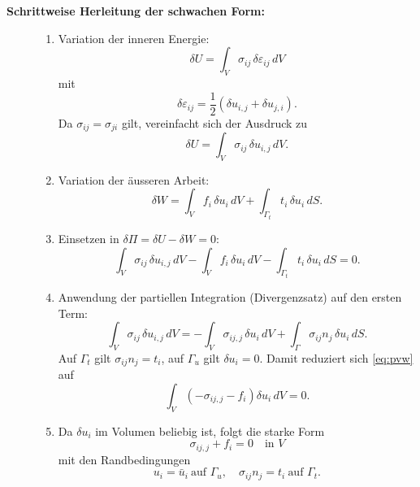 \begin{description}
	\item[\textbf{Schrittweise Herleitung der schwachen Form:}]
	\begin{enumerate}
		\item Variation der inneren Energie:
		\begin{equation*}
			\delta U = 
			\int_V \sigma_{ij} \, \delta \varepsilon_{ij} \, dV
		\end{equation*}
		mit
		\begin{equation*}
			\delta \varepsilon_{ij} = 
			\frac{1}{2} \left( \delta u_{i,j} + \delta u_{j,i} \right).
		\end{equation*}
		Da $\sigma_{ij} = \sigma_{ji}$ gilt, vereinfacht sich der Ausdruck zu
		\begin{equation*}
			\delta U = 
			\int_V \sigma_{ij} \, \delta u_{i,j} \, dV.
		\end{equation*}
		
		\item Variation der äusseren Arbeit:
		\begin{equation*}
			\delta W = 
			\int_V f_i \, \delta u_i \, dV + \int_{\Gamma_t} t_i \, \delta u_i \, dS.
		\end{equation*}
		
		\item Einsetzen in $\delta\Pi = \delta U - \delta W = 0$:
		\begin{equation}
			\int_V \sigma_{ij} \, \delta u_{i,j} \, dV - \int_V f_i \, \delta u_i \, dV - \int_{\Gamma_t} t_i \, \delta u_i \, dS = 
			0.
			\label{eq:pvw}
		\end{equation}
		
		\item Anwendung der partiellen Integration (Divergenzsatz) auf den ersten Term:
		\begin{equation*}
			\int_V \sigma_{ij} \, \delta u_{i,j} \, dV 
			= -\int_V \sigma_{ij,j} \, \delta u_i \, dV + \int_{\Gamma} \sigma_{ij} n_j \, \delta u_i \, dS.
		\end{equation*}
		Auf $\Gamma_t$ gilt $\sigma_{ij} n_j = t_i$, auf $\Gamma_u$ gilt $\delta u_i = 0$. 
		Damit reduziert sich \eqref{eq:pvw} auf
		\begin{equation*}
			\int_V \left( -\sigma_{ij,j} - f_i \right) \delta u_i \, dV = 
			0.
		\end{equation*}
		
		\item Da $\delta u_i$ im Volumen beliebig ist, folgt die starke Form
		\begin{equation*}
			\sigma_{ij,j} + f_i = 
			0 \quad \text{in } V
		\end{equation*}
		mit den Randbedingungen
		\begin{equation*}
			u_i = \bar u_i \ \text{auf } \Gamma_u, \quad \sigma_{ij} n_j =
			t_i \ \text{auf } \Gamma_t.
		\end{equation*}
	\end{enumerate}
\end{description}

